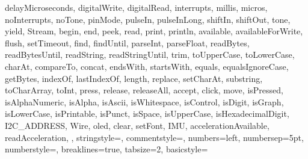 {{			delayMicroseconds, digitalWrite, digitalRead, interrupts, millis, 
			micros, noInterrupts, noTone, pinMode, pulseIn, pulseInLong, shiftIn, 
			shiftOut, tone, yield, Stream, begin, end, peek, read, print, 
			println, available, availableForWrite, flush, setTimeout, find, 
			findUntil, parseInt, parseFloat, readBytes, readBytesUntil, readString, 
			readStringUntil, trim, toUpperCase, toLowerCase, charAt, compareTo, 
			concat, endsWith, startsWith, equals, equalsIgnoreCase, getBytes, 
			indexOf, lastIndexOf, length, replace, setCharAt, substring, 
			toCharArray, toInt, press, release, releaseAll, accept, click, move, 
			isPressed, isAlphaNumeric, isAlpha, isAscii, isWhitespace, isControl, 
			isDigit, isGraph, isLowerCase, isPrintable, isPunct, isSpace, 
			isUpperCase, isHexadecimalDigit,
			I2C_ADDRESS, Wire, oled, clear, setFont, IMU, accelerationAvailable, readAcceleration, 
		},      
		stringstyle=\color{arduinoDarkBlue},    
		commentstyle=\color{arduinoGrey},    
		numbers=left,                    
		numbersep=5pt,                   
		numberstyle=\color{arduinoGrey},    
		breaklines=true,                    %
		tabsize=2,         
		basicstyle=\ttfamily  
	}